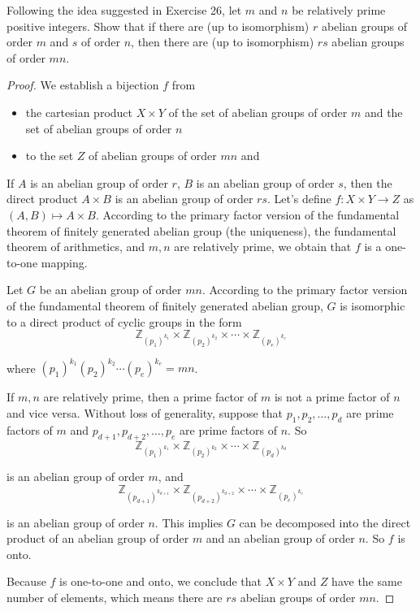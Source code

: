 \newpage
\begin{exercise}
    Following the idea suggested in Exercise 26, let $m$ and $n$ be relatively prime positive integers. Show that if there are (up to isomorphism) $r$ abelian groups of order $m$ and $s$ of order $n$, then there are (up to isomorphism) $rs$ abelian groups of order $mn$.
\end{exercise}

\begin{proof}
    We establish a bijection $f$ from
    \begin{itemize}
        \item the cartesian product $X\times Y$ of the set of abelian groups of order $m$ and the set of abelian groups of order $n$
        \item to the set $Z$ of abelian groups of order $mn$ and
    \end{itemize}

    If $A$ is an abelian group of order $r$, $B$ is an abelian group of order $s$, then the direct product $A\times B$ is an abelian group of order $rs$. Let's define $f: X\times Y \to Z$ as $(A, B) \mapsto A\times B$. According to the primary factor version of the fundamental theorem of finitely generated abelian group (the uniqueness), the fundamental theorem of arithmetics, and $m, n$ are relatively prime, we obtain that $f$ is a one-to-one mapping.

    Let $G$ be an abelian group of order $mn$. According to the primary factor version of the fundamental theorem of finitely generated abelian group, $G$ is isomorphic to a direct product of cyclic groups in the form
    \[
        \mathbb{Z}_{{(p_{1})}^{k_{1}}} \times \mathbb{Z}_{{(p_{2})}^{k_{2}}} \times \cdots \times \mathbb{Z}_{{(p_{e})}^{k_{e}}}
    \]

    where ${(p_{1})}^{k_{1}}{(p_{2})}^{k_{2}}\cdots {(p_{e})}^{k_{e}} = mn$.

    If $m, n$ are relatively prime, then a prime factor of $m$ is not a prime factor of $n$ and vice versa. Without loss of generality, suppose that $p_{1}, p_{2}, \ldots, p_{d}$ are prime factors of $m$ and $p_{d+1}, p_{d+2}, \ldots, p_{e}$ are prime factors of $n$. So
    \[
        \mathbb{Z}_{{(p_{1})}^{k_{1}}} \times \mathbb{Z}_{{(p_{2})}^{k_{2}}} \times \cdots \times \mathbb{Z}_{{(p_{d})}^{k_{d}}}
    \]

    is an abelian group of order $m$, and
    \[
        \mathbb{Z}_{{(p_{d+1})}^{k_{d+1}}} \times \mathbb{Z}_{{(p_{d+2})}^{k_{d+2}}} \times \cdots \times \mathbb{Z}_{{(p_{e})}^{k_{e}}}
    \]

    is an abelian group of order $n$. This implies $G$ can be decomposed into the direct product of an abelian group of order $m$ and an abelian group of order $n$. So $f$ is onto.

    Because $f$ is one-to-one and onto, we conclude that $X\times Y$ and $Z$ have the same number of elements, which means there are $rs$ abelian groups of order $mn$.
\end{proof}

